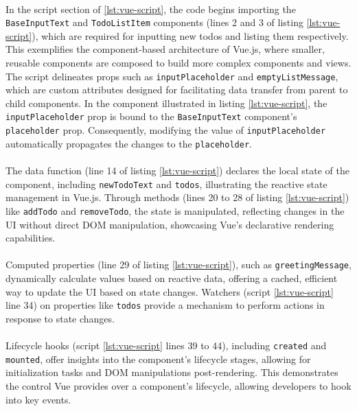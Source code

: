 \paragraph{} In the script section of \ref{lst:vue-script}, the code begins importing the \verb|BaseInputText| and \verb|TodoListItem| components (lines 2 and 3 of listing \ref{lst:vue-script}), which are required for inputting new todos and listing them respectively. This exemplifies the component-based architecture of Vue.js, where smaller, reusable components are composed to build more complex components and views. The script delineates props such as \verb|inputPlaceholder| and \verb|emptyListMessage|, which are custom attributes designed for facilitating data transfer from parent to child components. In the component illustrated in listing \ref{lst:vue-script}, the \verb|inputPlaceholder| prop is bound to the \verb|BaseInputText| component's \verb|placeholder| prop. Consequently, modifying the value of \verb|inputPlaceholder| automatically propagates the changes to the \verb|placeholder|.

\paragraph{} The data function (line 14 of listing \ref{lst:vue-script}) declares the local state of the component, including \verb|newTodoText| and \verb|todos|, illustrating the reactive state management in Vue.js. Through methods (lines 20 to 28 of listing \ref{lst:vue-script}) like \verb|addTodo| and \verb|removeTodo|, the state is manipulated, reflecting changes in the UI without direct DOM manipulation, showcasing Vue's declarative rendering capabilities.

\paragraph{}  Computed properties (line 29 of listing \ref{lst:vue-script}), such as \verb|greetingMessage|, dynamically calculate values based on reactive data, offering a cached, efficient way to update the UI based on state changes. Watchers (script \ref{lst:vue-script} line 34) on properties like \verb|todos| provide a mechanism to perform actions in response to state changes.

\paragraph{} Lifecycle hooks (script \ref{lst:vue-script} lines 39 to 44), including \verb|created| and \verb|mounted|, offer insights into the component's lifecycle stages, allowing for initialization tasks and DOM manipulations post-rendering. This demonstrates the control Vue provides over a component's lifecycle, allowing developers to hook into key events.


